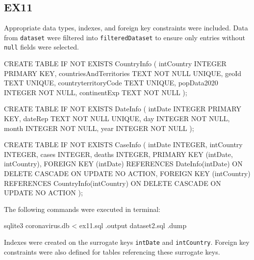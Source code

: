 \documentclass[]{article}
\begin{document}
\subsection{EX11}
Appropriate data types, indexes, and foreign key constraints were included. Data from \verb|dataset| were filtered into \verb|filteredDataset| to ensure only entries without \verb|null| fields were selected.
\begin{ffcode}
CREATE TABLE IF NOT EXISTS CountryInfo (
    intCountry INTEGER PRIMARY KEY,
    countriesAndTerritories TEXT NOT NULL UNIQUE,
    geoId TEXT UNIQUE,
    countryterritoryCode TEXT UNIQUE,
    popData2020 INTEGER NOT NULL,
    continentExp TEXT NOT NULL
);

CREATE TABLE IF NOT EXISTS DateInfo (
    intDate INTEGER PRIMARY KEY,
    dateRep TEXT NOT NULL UNIQUE,
    day INTEGER NOT NULL,
    month INTEGER NOT NULL,
    year INTEGER NOT NULL
);

CREATE TABLE IF NOT EXISTS CaseInfo (
    intDate INTEGER,
    intCountry INTEGER,
    cases INTEGER,
    deaths INTEGER,
    PRIMARY KEY (intDate, intCountry),
    FOREIGN KEY (intDate) REFERENCES DateInfo(intDate)
        ON DELETE CASCADE
        ON UPDATE NO ACTION,
    FOREIGN KEY (intCountry) REFERENCES CountryInfo(intCountry)
        ON DELETE CASCADE
        ON UPDATE NO ACTION
);
\end{ffcode}
\noindent
The following commands were executed in terminal:
\begin{ffcode}
sqlite3 coronavirus.db < ex11.sql
.output dataset2.sql
.dump
\end{ffcode}
\noindent
Indexes were created on the surrogate keys \verb|intDate| and \verb|intCountry|. Foreign key constraints were also defined for tables referencing these surrogate keys.
\end{document}
